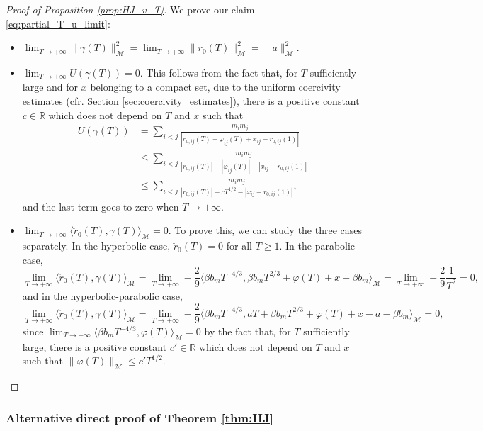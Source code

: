 \documentclass[a4paper,10pt]{amsart}
\newcommand{\numberset}{\mathbb}
\newcommand{\R}{\numberset{R}}
\theoremstyle{plain}
\theoremstyle{definition}
\numberwithin{equation}{section}
\numberwithin{thm}{section}
\begin{document}
\begin{proof}[Proof of Proposition \ref{prop:HJ_v_T}]
\smallskip
We prove our claim \eqref{eq:partial_T_u_limit}:
\begin{itemize}
    \item $\lim_{T\rightarrow+\infty}\|\dot\gamma(T)\|_\mathcal{M}^2=\lim_{T\rightarrow+\infty}\|\dot r_0(T)\|_\mathcal{M}^2=\|a\|_\mathcal{M}^2$.
    \item $\lim_{T\rightarrow+\infty}U(\gamma(T))=0$. This follows from the fact that, for $T$ sufficiently large and for $x$ belonging to a compact set, due to the uniform coercivity estimates (cfr. Section \ref{sec:coercivity_estimates}), there is a positive constant $c\in\R$ which does not depend on $T$ and $x$ such that
    \[
    \begin{split}
    U(\gamma(T)) &= \sum_{i<j}\frac{m_i m_j}{|r_{0,ij}(T) + \varphi_{ij}(T)+x_{ij}-r_{0,ij}(1)|}\\
    &\leq \sum_{i<j}\frac{m_i m_j}{|r_{0,ij}(T)| - |\varphi_{ij}(T)|-|x_{ij}-r_{0,ij}(1)|}\\
    &\leq \sum_{i<j}\frac{m_i m_j}{|r_{0,ij}(T)| - c T^{1/2}-|x_{ij}-r_{0,ij}(1)|},
    \end{split}
    \]
    and the last term goes to zero when $T\rightarrow+\infty$.
    \item $\lim_{T\rightarrow+\infty} \langle \ddot{r}_0(T),\gamma(T)\rangle_\mathcal{M}=0$. To prove this, we can study the three cases separately. In the hyperbolic case, $\ddot r_0(T)=0$ for all $T\geq1$. In the parabolic case,
    \[
    \lim_{T\rightarrow+\infty}\langle \ddot{r}_0(T),\gamma(T)\rangle_\mathcal{M} =  \lim_{T\rightarrow+\infty}-\frac{2}{9}\langle \beta b_m T^{-4/3}, \beta b_m T^{2/3}+ \varphi(T) + x - \beta b_m\rangle_\mathcal{M}=\lim_{T\rightarrow+\infty}-\frac{2}{9}\frac{1}{T^2}=0,
    \]
    and in the hyperbolic-parabolic case,
    \[
    \lim_{T\rightarrow+\infty}\langle \ddot{r}_0(T),\gamma(T)\rangle_\mathcal{M} = \lim_{T\rightarrow+\infty}-\frac{2}{9}\langle \beta b_m T^{-4/3},aT + \beta b_m T^{2/3} + \varphi(T) + x -a - \beta b_m\rangle_\mathcal{M}=0,
    \]
    since $\lim_{T\rightarrow+\infty}\langle\beta b_m T^{-4/3},\varphi(T)\rangle_\mathcal{M}=0$ by the fact that, for $T$ sufficiently large, there is a positive constant $c'\in\R$ which does not depend on $T$ and $x$ such that $\|\varphi(T)\|_\mathcal{M}\leq c'T^{1/2}$.
\end{itemize}
\end{proof}

\subsubsection{Alternative direct proof of Theorem \ref{thm:HJ}}
\end{document}

